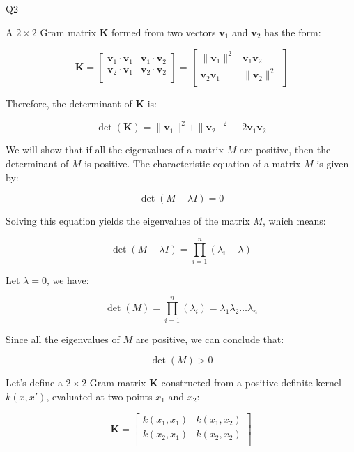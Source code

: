 \question Q2\droppoints

\begin{solution}
     A $2 \times 2$ Gram matrix $\mathbf{K}$ formed from two vectors $\mathbf{v}_1$ and $\mathbf{v}_2$ has the form:

    \[
        \mathbf{K} =
        \begin{bmatrix}
            \mathbf{v}_1 \cdot \mathbf{v}_1 & \mathbf{v}_1 \cdot \mathbf{v}_2 \\
            \mathbf{v}_2 \cdot \mathbf{v}_1 & \mathbf{v}_2 \cdot \mathbf{v}_2 \\
        \end{bmatrix}
        =
        \begin{bmatrix}
            \| \mathbf{v}_1 \|^2      & \mathbf{v}_1 \mathbf{v}_2 \\
            \mathbf{v}_2 \mathbf{v}_1 & \| \mathbf{v}_2 \|^2      \\
        \end{bmatrix}
    \]

    Therefore, the determinant of $\mathbf{K}$ is:

    \[
        \det(\mathbf{K}) = \| \mathbf{v}_1 \|^2 + \| \mathbf{v}_2 \|^2 - 2\mathbf{v}_1 \mathbf{v}_2
    \]

     We will show that if all the eigenvalues of a matrix $M$ are positive, then the determinant of $M$ is positive.
    The characteristic equation of a matrix $M$ is given by:

    \[
        \det(M - \lambda I) = 0
    \]

    Solving this equation yields the eigenvalues of the matrix $M$, which means:

    \[
        \det(M - \lambda I) = \prod_{i = 1}^{n}(\lambda_i - \lambda)
    \]

    Let $\lambda = 0$, we have:

    \[
        \det(M) = \prod_{i = 1}^{n}(\lambda_i) = \lambda_1 \lambda_2 \dots \lambda_n
    \]

    Since all the eigenvalues of $M$ are positive, we can conclude that:

    \[
        \det(M) > 0
    \]

    Let's define a $2 \times 2$ Gram matrix $\mathbf{K}$ constructed from a positive definite kernel $k(x, x')$, evaluated at two points $x_1$ and $x_2$:

    \[
        \mathbf{K} =
        \begin{bmatrix}
            k(x_1, x_1) & k(x_1, x_2) \\
            k(x_2, x_1) & k(x_2, x_2) \\
        \end{bmatrix}
    \]


\end{solution}
